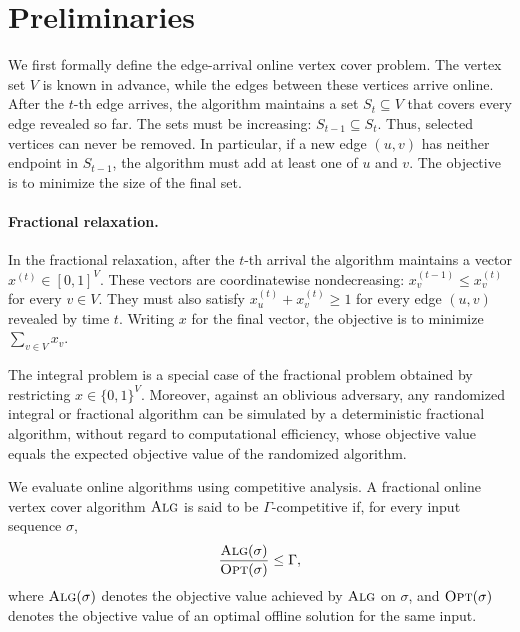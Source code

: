 \section{Preliminaries}

We first formally define the edge-arrival online vertex cover problem. The vertex set $V$ is known in advance, while the edges between these vertices arrive online. After the $t$-th edge arrives, the algorithm maintains a set $S_t\subseteq V$ that covers every edge revealed so far. The sets must be increasing: $S_{t-1}\subseteq S_t$. Thus, selected vertices can never be removed. In particular, if a new edge $(u,v)$ has neither endpoint in $S_{t-1}$, the algorithm must add at least one of $u$ and $v$. The objective is to minimize the size of the final set.

\paragraph{Fractional relaxation.}
In the fractional relaxation, after the $t$-th arrival the algorithm maintains a vector $x^{(t)}\in[0,1]^V$. These vectors are coordinatewise nondecreasing: $x^{(t-1)}_v\leq x^{(t)}_v$ for every $v\in V$. They must also satisfy $x^{(t)}_u+x^{(t)}_v\geq 1$ for every edge $(u,v)$ revealed by time $t$. Writing $x$ for the final vector, the objective is to minimize $\sum_{v\in V}x_v$.

The integral problem is a special case of the fractional problem obtained by restricting $x\in \{0,1\}^V$. Moreover, against an oblivious adversary, any randomized integral or fractional algorithm can be simulated by a deterministic fractional algorithm, without regard to computational efficiency, whose objective value equals the expected objective value of the randomized algorithm.

We evaluate online algorithms using competitive analysis. A fractional online vertex cover algorithm $\textsc{Alg}$ is said to be $\Gamma$-competitive if, for every input sequence $\sigma$,
$$
\frac{\textsc{Alg}(\sigma)}{\textsc{Opt}(\sigma)} \leq \Gamma,
$$
where $\textsc{Alg}(\sigma)$ denotes the objective value achieved by $\textsc{Alg}$ on $\sigma$, and $\textsc{Opt}(\sigma)$ denotes the objective value of an optimal offline solution for the same input.
